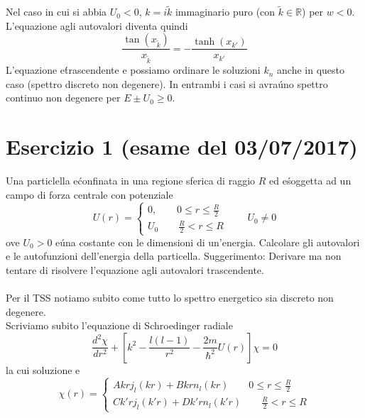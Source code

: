 \documentclass[a4paper]{article}
\begin{document}
        Nel caso in cui si abbia $U_0<0$, $k=i\tilde{k}$ immaginario puro (con $\tilde{k}\in\mathbb{R}$) per $w<0$.
        L'equazione agli autovalori diventa quindi
        \begin{equation*}
            \frac{\tan(x_{\tilde{k}})}{x_{\tilde{k}}}=-\frac{\tanh(x_{k'})}{x_{k'}}
        \end{equation*}
        L'equazione e\' trascendente e possiamo ordinare le soluzioni $k_n$ anche in questo caso (spettro discreto non degenere).
        In entrambi i casi si avra\' uno spettro continuo non degenere per $E\pm U_0\geq 0$.

    \section*{Esercizio 1 (esame del 03/07/2017)}
    Una particlella e\' confinata in una regione sferica di raggio $R$ ed e\' soggetta ad un campo di forza centrale con potenziale
    \begin{equation*}
        U(r)=
        \begin{cases}
            0,\quad\quad 0\leq r\leq\frac{R}{2}\\
            U_0\quad\quad \frac{R}{2}<r\leq R
        \end{cases}
        \quad\quad U_0\neq 0
    \end{equation*}
    ove $U_0 > 0$ e\' una costante con le dimensioni di un'energia. Calcolare gli autovalori e le autofunzioni dell'energia della particella.
    Suggerimento: Derivare ma non tentare di risolvere l'equazione agli autovalori trascendente.
    \\
    \\
    Per il TSS notiamo subito come tutto lo spettro energetico sia discreto non degenere.\\
    Scriviamo subito l'equazione di Schroedinger radiale
    \begin{equation*}
        \frac{d^2\chi}{dr^2}+\left[k^2-\frac{l(l-1)}{r^2}-\frac{2m}{\hbar^2}U(r)\right]\chi=0
    \end{equation*}
    la cui soluzione e\'
    \begin{equation*}
        \chi(r)=
        \begin{cases}
            Akrj_l(kr)+Bkrn_l(kr)\quad\quad 0\leq r\leq\frac{R}{2}\\
            Ck'rj_l(k'r)+Dk'rn_l(k'r)\quad\quad \frac{R}{2}<r\leq R
        \end{cases}
    \end{equation*}
\end{document}
